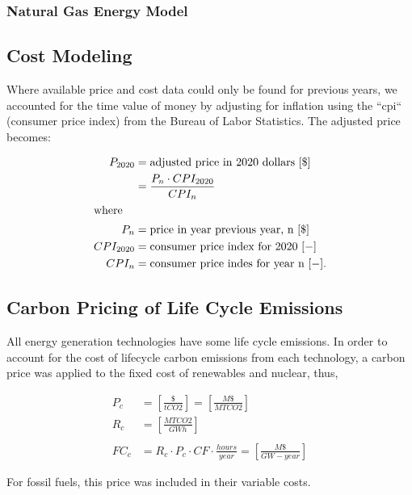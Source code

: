 \subsubsection{Natural Gas Energy Model}
\subsection{Cost Modeling}
Where available price and cost data could only be found for previous years, we 
                accounted for the time value of money by adjusting for 
                inflation using the ``cpi`` (consumer price index) from the 
                Bureau of Labor Statistics. The adjusted price becomes: 

\begin{align}
        P_{2020} &= \mbox{adjusted price in 2020 dollars }[\$]\\
                &= \frac{P_{n} \cdot CPI_{2020}}{CPI_{n}}\\
        \intertext{where}
        P_n &= \mbox{price in year previous year, n } [\$]\\
        CPI_{2020} &= \mbox{consumer price index for 2020 } [-]\\
        CPI_n &= \mbox{consumer price indes for year n } [-].
\end{align}


\subsection{Carbon Pricing of Life Cycle Emissions}
All energy generation technologies have some life cycle emissions.
In order to account for the cost of lifecycle carbon emissions from each 
technology, a carbon price was applied to the fixed cost of renewables and 
nuclear, thus,

\begin{align}
P_c &= \left[\frac{\$}{tCO2}\right] = \left[\frac{M\$}{MTCO2}\right]\\
R_c &= \left[\frac{MTCO2}{GWh}\right]\\\\
FC_c &= R_c\cdot P_c \cdot CF \cdot \frac{hours}{year} = \left[\frac{M\$}{GW-year}\right]
\end{align}

For fossil fuels, this price was included in their variable costs.

